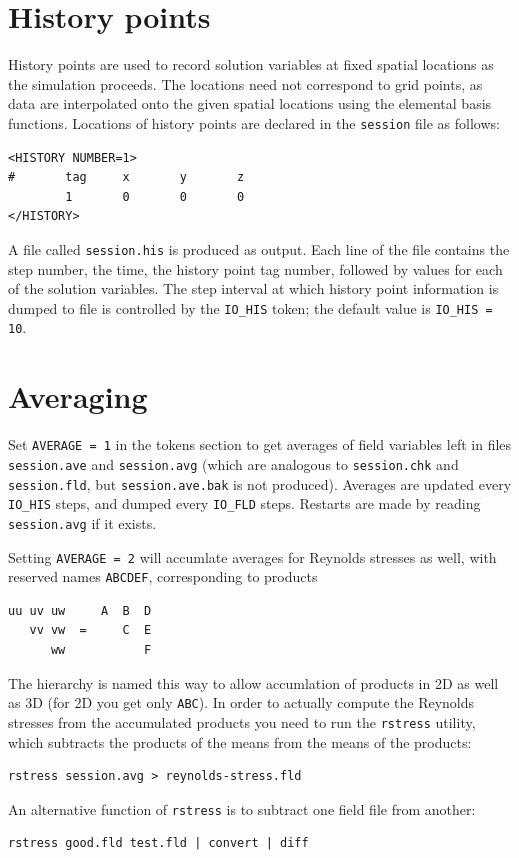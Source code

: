 \documentclass[11pt,a4paper]{report}
\begin{document}
\section{History points}

History points are used to record solution variables at fixed spatial
locations as the simulation proceeds.  The locations need not
correspond to grid points, as data are interpolated onto the given
spatial locations using the elemental basis functions.  Locations of
history points are declared in the \verb+session+ file as follows:
\begin{verbatim}
<HISTORY NUMBER=1>
#       tag     x       y       z 
        1       0       0       0
</HISTORY>
\end{verbatim}

A file called \verb+session.his+ is produced as output.  Each line of
the file contains the step number, the time, the history point tag
number, followed by values for each of the solution variables.  The
step interval at which history point information is dumped to file is
controlled by the \verb+IO_HIS+ token; the default value is
\verb+IO_HIS = 10+.

\section{Averaging}

Set \verb+AVERAGE = 1+ in the tokens section to get averages of field
variables left in files \verb+session.ave+ and \verb+session.avg+
(which are analogous to \verb+session.chk+ and \verb+session.fld+, but
\verb+session.ave.bak+ is not produced).  Averages are updated
every \verb+IO_HIS+ steps, and dumped every \verb+IO_FLD+ steps.
Restarts are made by reading \verb+session.avg+ if it exists.

Setting \verb+AVERAGE = 2+ will accumlate averages for Reynolds
stresses as well, with reserved names \verb+ABCDEF+, corresponding to
products
\begin{verbatim}
uu uv uw     A  B  D
   vv vw  =     C  E
      ww           F
\end{verbatim}
The hierarchy is named this way to allow accumlation of products in 2D
as well as 3D (for 2D you get only \verb+ABC+).  In order to actually
compute the Reynolds stresses from the accumulated products you need
to run the \verb+rstress+ utility, which subtracts the products of the
means from the means of the products:
\begin{verbatim}
rstress session.avg > reynolds-stress.fld
\end{verbatim}
An alternative function of \verb+rstress+ is to subtract one field
file from another:
\begin{verbatim}
rstress good.fld test.fld | convert | diff
\end{verbatim}
\end{document}
